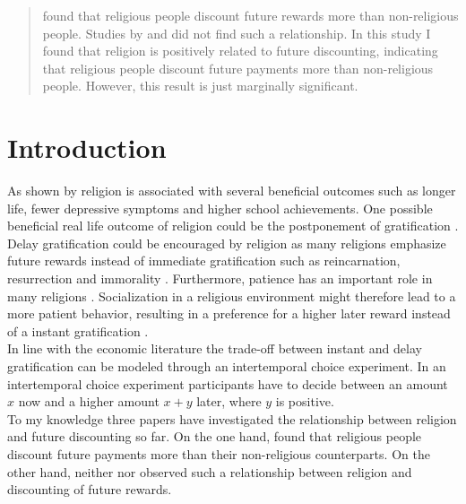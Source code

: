 \documentclass[10pt,a4paper]{article}
\begin{document}

\newpage


\tableofcontents
\listoffigures
\listoftables

\newpage

\begin{abstract}
\textcite{carter2012religious} found that religious people discount future rewards more than non-religious people. Studies by\textcite{thornton2015divine} and \textcite{benjamin2010religious} did not find such a relationship. In this study I found that religion is positively related to future discounting, indicating that religious people discount future payments more than non-religious people. However, this result is just marginally significant.
\end{abstract}
 

\section{Introduction}
As shown by \textcite{mccullough2013religion} religion is associated with several beneficial outcomes such as longer life, fewer depressive symptoms and higher school achievements. One possible beneficial real life outcome of religion could be the postponement of gratification \parencite{carter2012religious}. Delay gratification could be encouraged by religion as many religions emphasize future rewards instead of immediate gratification such as reincarnation, resurrection and immorality \parencite{carter2012religious}. Furthermore, patience has an important role in many religions \parencite{carter2012religious}. Socialization in a religious environment might therefore lead to a more patient behavior, resulting in a preference for a higher later reward instead of a instant gratification \parencite{carter2012religious}.\\
In line with the economic literature the trade-off between instant and delay gratification can be modeled through an intertemporal choice experiment. In an intertemporal choice experiment participants have to decide between an amount $x$ now and a higher amount $x+y$ later, where $y$ is positive.\\ 

To my knowledge three papers have investigated the relationship between religion and future discounting so far. On the one hand, \textcite{carter2012religious} found that religious people discount future payments more than their non-religious counterparts. On the other hand, neither \textcite{thornton2015divine} nor \textcite{benjamin2010religious} observed such a relationship between religion and discounting of future rewards.\\ 
\end{document}
